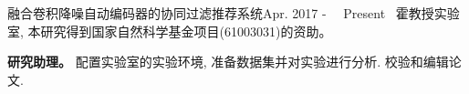 \documentclass{sorahjy_cv}
\begin{document}
\begin{sectionContentNormal}{融合卷积降噪自动编码器的协同过滤推荐系统}{Apr. 2017 - \ \ Present \ }{霍教授实验室, 本研究得到国家自然科学基金项目(61003031)的资助。 }
	\item \textbf{研究助理。} 配置实验室的实验环境, 准备数据集并对实验进行分析. 校验和编辑论文.
\end{sectionContentNormal}

%
%



%
%






\end{document}
